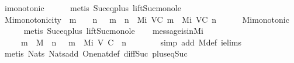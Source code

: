 \begin{isabellebody}
\ {\isasymSigma}i{\isacharunderscore}monotonic\isanewline
\ \ \ \ \isamarkupfalse%
\ {\isacharparenleft}metis\ Suc{\isacharunderscore}eq{\isacharunderscore}plus{}\ lift{\isacharunderscore}Suc{\isacharunderscore}mono{\isacharunderscore}le{\isacharparenright}%
\endisatagproof
{\isafoldproof}%
%
\isadelimproof
\isanewline
%
\endisadelimproof
\isanewline
\ \ \isamarkupfalse%
\ Mi{\isacharunderscore}monotonicity{\isacharcolon}\ {\isachardoublequoteopen}{\isasymforall}\ m\ {\isasymin}\ {\isasymnat}{\isachardot}\ {\isasymforall}\ n\ {\isasymin}\ {\isasymnat}{\isachardot}\ m\ {\isasymle}\ n\ {\isasymlongrightarrow}\ M{\isacharunderscore}i\ {\isacharparenleft}V{\isacharcomma}C{\isacharcomma}{\isasymepsilon}{\isacharparenright}\ m\ {\isasymsubseteq}\ M{\isacharunderscore}i\ {\isacharparenleft}V{\isacharcomma}C{\isacharcomma}{\isasymepsilon}{\isacharparenright}\ n{\isachardoublequoteclose}\isanewline
%
\isadelimproof
\ \ \ \ %
\endisadelimproof
%
\isatagproof
{}\isamarkupfalse%
\ Mi{\isacharunderscore}monotonic\isanewline
\ \ \ \ \isamarkupfalse%
\ {\isacharparenleft}metis\ Suc{\isacharunderscore}eq{\isacharunderscore}plus{}\ lift{\isacharunderscore}Suc{\isacharunderscore}mono{\isacharunderscore}le{\isacharparenright}%
\endisatagproof
{\isafoldproof}%
%
\isadelimproof
\isanewline
%
\endisadelimproof
\isanewline
\ \ \isamarkupfalse%
\ message{\isacharunderscore}is{\isacharunderscore}in{\isacharunderscore}M{\isacharunderscore}i\ {\isacharcolon}\isanewline
\ \ \ \ {\isachardoublequoteopen}{\isasymforall}\ m\ {\isasymin}\ M{\isachardot}\ {\isasymexists}\ n\ {\isasymin}\ {\isasymnat}{\isachardot}\ m\ {\isasymin}\ M{\isacharunderscore}i\ {\isacharparenleft}V{\isacharcomma}\ C{\isacharcomma}\ {\isasymepsilon}{\isacharparenright}\ {\isacharparenleft}n\ {\isacharminus}\ {}{\isacharparenright}{\isachardoublequoteclose}\isanewline
%
\isadelimproof
\ \ \ \ %
\endisadelimproof
%
\isatagproof
{}\isamarkupfalse%
\ {\isacharparenleft}simp\ add{\isacharcolon}\ M{\isacharunderscore}def\ {\isasymSigma}{\isacharunderscore}i{\isachardot}elims{\isacharparenright}\isanewline
\ \ \ \ \isamarkupfalse%
\ {\isacharparenleft}metis\ Nats{\isacharunderscore}{}\ Nats{\isacharunderscore}add\ One{\isacharunderscore}nat{\isacharunderscore}def\ diff{\isacharunderscore}Suc{\isacharunderscore}{}\ plus{\isacharunderscore}{}{\isacharunderscore}eq{\isacharunderscore}Suc{\isacharparenright}%
\endisatagproof
{\isafoldproof}%

\end{isabellebody}
